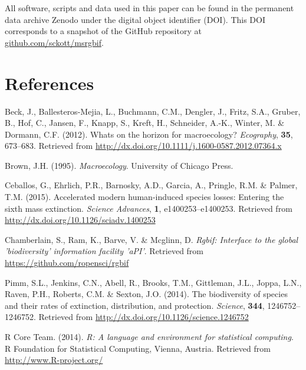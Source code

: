 \documentclass[author-year, review, 11pt]{components/elsarticle} %
\begin{document}
All software, scripts and data used in this paper can be found in the
permanent data archive Zenodo under the digital object identifier (DOI).
This DOI corresponds to a snapshot of the GitHub repository at
\href{https://github.com/sckott/msrgbif}{github.com/sckott/msrgbif}.

\section*{References}\label{references}

Beck, J., Ballesteros-Mejia, L., Buchmann, C.M., Dengler, J., Fritz,
S.A., Gruber, B., Hof, C., Jansen, F., Knapp, S., Kreft, H., Schneider,
A.-K., Winter, M. \& Dormann, C.F. (2012). Whats on the horizon for
macroecology? \emph{Ecography}, \textbf{35}, 673--683. Retrieved from
\url{http://dx.doi.org/10.1111/j.1600-0587.2012.07364.x}

Brown, J.H. (1995). \emph{Macroecology}. University of Chicago Press.

Ceballos, G., Ehrlich, P.R., Barnosky, A.D., Garcia, A., Pringle, R.M.
\& Palmer, T.M. (2015). Accelerated modern human-induced species losses:
Entering the sixth mass extinction. \emph{Science Advances}, \textbf{1},
e1400253--e1400253. Retrieved from
\url{http://dx.doi.org/10.1126/sciadv.1400253}

Chamberlain, S., Ram, K., Barve, V. \& Mcglinn, D. \emph{Rgbif:
Interface to the global 'biodiversity' information facility 'aPI'}.
Retrieved from \url{https://github.com/ropensci/rgbif}

Pimm, S.L., Jenkins, C.N., Abell, R., Brooks, T.M., Gittleman, J.L.,
Joppa, L.N., Raven, P.H., Roberts, C.M. \& Sexton, J.O. (2014). The
biodiversity of species and their rates of extinction, distribution, and
protection. \emph{Science}, \textbf{344}, 1246752--1246752. Retrieved
from \url{http://dx.doi.org/10.1126/science.1246752}

R Core Team. (2014). \emph{R: A language and environment for statistical
computing}. R Foundation for Statistical Computing, Vienna, Austria.
Retrieved from \url{http://www.R-project.org/}
\end{document}
